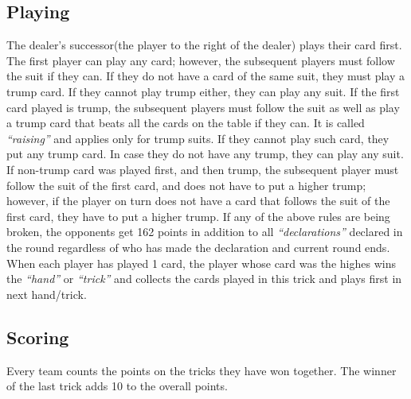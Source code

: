 \subsection{Playing}
\hspace{\parindent} The dealer's successor(the player to the right of the dealer) plays their card first.
The first player can play any card; however, the subsequent players must follow the suit if they can.
If they do not have a card of the same suit, they must play a trump card.
If they cannot play trump either, they can play any suit.
If the first card played is trump, the subsequent players must follow the suit as well as play a trump card that beats all the cards on the table if they can.
It is called \textit{``raising''} and applies only for trump suits.
If they cannot play such card, they put any trump card.
In case they do not have any trump, they can play any suit.
If non-trump card was played first, and then trump, the subsequent player must follow the suit of the first card, and does not have to put a higher trump; however, if the player on turn does not have a card that follows the suit of the first card, they have to put a higher trump.
If any of the above rules are being broken, the opponents get 162 points in addition to all \textit{``declarations''} declared in the round regardless of who has made the declaration and current round ends.
When each player has played 1 card, the player whose card was the highes wins the \textit{``hand''} or \textit{``trick''} and collects the cards played in this trick and plays first in next hand/trick.


\subsection{Scoring}
\hspace{\parindent} Every team counts the points on the tricks they have won together.
The winner of the last trick adds 10 to the overall points.\\

